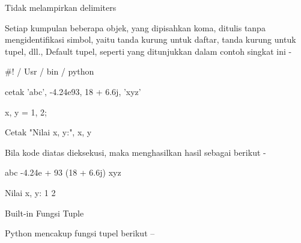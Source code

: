 \documentclass[a4paper,12pt]{report}
\begin{document}


\vspace{12pt}
\noindent 
{\fontsize{14pt}{14pt}\selectfont Tidak melampirkan delimiters \\} \par
\noindent 
{\fontsize{14pt}{14pt}\selectfont Setiap kumpulan beberapa objek, yang dipisahkan koma, ditulis tanpa mengidentifikasi simbol, yaitu tanda kurung untuk daftar, tanda kurung untuk tupel, dll., Default tupel, seperti yang ditunjukkan dalam contoh singkat ini - \\} \par
\noindent 
{\fontsize{14pt}{14pt}\selectfont  $  \#  $! / Usr / bin / python \\} \par
\vspace{14pt}
\noindent 
{\fontsize{14pt}{14pt}\selectfont cetak 'abc', -4.24e93, 18 + 6.6j, 'xyz' \\} \par
\noindent 
{\fontsize{14pt}{14pt}\selectfont x, y = 1, 2; \\} \par
\noindent 
{\fontsize{14pt}{14pt}\selectfont Cetak "Nilai x, y:", x, y \\} \par
\noindent 
{\fontsize{14pt}{14pt}\selectfont Bila kode diatas dieksekusi, maka menghasilkan hasil sebagai berikut - \\} \par
\noindent 
{\fontsize{14pt}{14pt}\selectfont abc -4.24e + 93 (18 + 6.6j) xyz \\} \par
\noindent 
{\fontsize{14pt}{14pt}\selectfont Nilai x, y: 1 2 \\} \par
\noindent 
{\fontsize{14pt}{14pt}\selectfont Built-in Fungsi Tuple \\} \par
\noindent 
{\fontsize{14pt}{14pt}\selectfont Python mencakup fungsi tupel berikut – \\} \par
\vspace{14pt}
\vspace{14pt}
\vspace{12pt}


\end{document}
